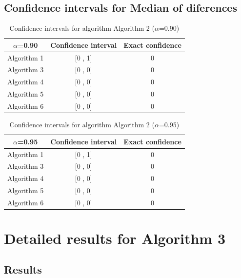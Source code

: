 \documentclass[a4paper,10pt]{article}
\begin{document}
\subsection{Confidence intervals for Median of diferences}

\begin{table}[!htp]
\centering\small
\begin{tabular}{
|c|c|c|}
\hline
 $\alpha$=0.90 & Confidence interval & Exact confidence \\ \hline 
Algorithm 1 & [0 , 1] & 0\\ \hline 
Algorithm 3 & [0 , 0] & 0\\ \hline 
Algorithm 4 & [0 , 0] & 0\\ \hline 
Algorithm 5 & [0 , 0] & 0\\ \hline 
Algorithm 6 & [0 , 0] & 0\\ \hline 

\end{tabular}
\caption{Confidence intervals for algorithm Algorithm 2 ($\alpha$=0.90)}
\end{table}
\begin{table}[!htp]
\centering\small
\begin{tabular}{
|c|c|c|}
\hline
 $\alpha$=0.95 & Confidence interval & Exact confidence \\ \hline 
Algorithm 1 & [0 , 1] & 0\\ \hline 
Algorithm 3 & [0 , 0] & 0\\ \hline 
Algorithm 4 & [0 , 0] & 0\\ \hline 
Algorithm 5 & [0 , 0] & 0\\ \hline 
Algorithm 6 & [0 , 0] & 0\\ \hline 

\end{tabular}
\caption{Confidence intervals for algorithm Algorithm 2 ($\alpha$=0.95)}
\end{table}

 \clearpage 


\section{Detailed results for Algorithm 3}


\subsection{Results}
\end{document}
